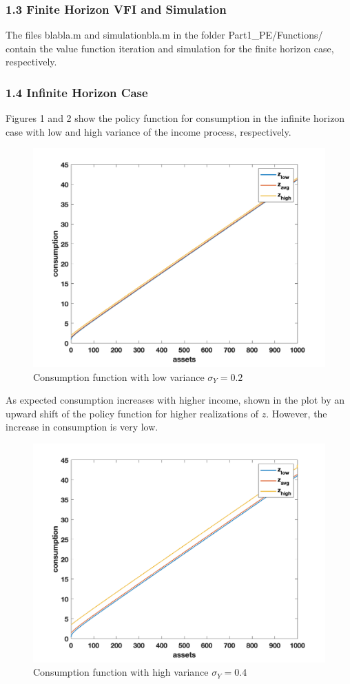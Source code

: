\documentclass[letterpaper,12pt]{article}
\begin{document}
\subsubsection*{1.3 Finite Horizon VFI and Simulation}
The files blabla.m and simulationbla.m in the folder Part1\_PE/Functions/ contain the value function iteration and simulation for the finite horizon case, respectively.




\subsubsection*{1.4 Infinite Horizon Case}
Figures 1 and 2 show the policy function for consumption in the infinite horizon case with low and high variance of the income process, respectively. 
\begin{figure}
\includegraphics[scale=0.5]{Figures/Part1_PE/consFunc_inf_low}
\caption{Consumption function with low variance $\sigma_Y = 0.2$}
\end{figure}
As expected consumption increases with higher income, shown in the plot by an upward shift of the policy function for higher realizations of $z$. However, the increase in consumption is very low. 
\begin{figure}
\includegraphics[scale=0.45]{Figures/Part1_PE/consFunc_inf_high}
\caption{Consumption function with high variance $\sigma_Y = 0.4$}
\end{figure}
\end{document}
